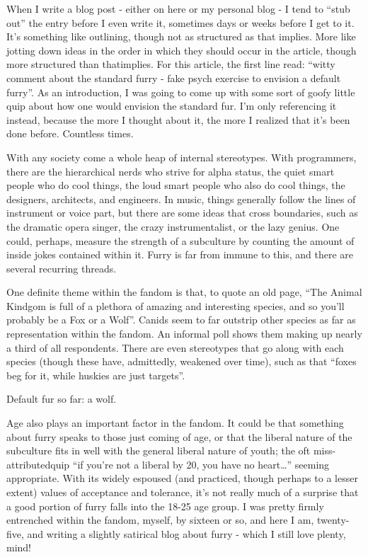 
When I write a blog post - either on here or my personal blog - I tend to ``stub out'' the entry before I even write it, sometimes days or weeks before I get to it. It's something like outlining, though not as structured as that implies. More like jotting down ideas in the order in which they should occur in the article, though more structured than thatimplies. For this article, the first line read: ``witty comment about the standard furry - fake psych exercise to envision a default furry''. As an introduction, I was going to come up with some sort of goofy little quip about how one would envision the standard fur. I'm only referencing it instead, because the more I thought about it, the more I realized that it's been done before. Countless times.

With any society come a whole heap of internal stereotypes. With programmers, there are the hierarchical nerds who strive for alpha status, the quiet smart people who do cool things, the loud smart people who also do cool things, the designers, architects, and engineers. In music, things generally follow the lines of instrument or voice part, but there are some ideas that cross boundaries, such as the dramatic opera singer, the crazy instrumentalist, or the lazy genius. One could, perhaps, measure the strength of a subculture by counting the amount of inside jokes contained within it. Furry is far from immune to this, and there are several recurring threads.

One definite theme within the fandom is that, to quote an old page, ``The Animal Kindgom is full of a plethora of amazing and interesting species, and so you'll probably be a Fox or a Wolf''. Canids seem to far outstrip other species as far as representation within the fandom. An informal poll shows them making up nearly a third of all respondents. There are even stereotypes that go along with each species (though these have, admittedly, weakened over time), such as that ``foxes beg for it, while huskies are just targets''.

Default fur so far: a wolf.

Age also plays an important factor in the fandom. It could be that something about furry speaks to those just coming of age, or that the liberal nature of the subculture fits in well with the general liberal nature of youth; the oft miss-attributedquip ``if you're not a liberal by 20, you have no heart\ldots{}'' seeming appropriate. With its widely espoused (and practiced, though perhaps to a lesser extent) values of acceptance and tolerance, it's not really much of a surprise that a good portion of furry falls into the 18-25 age group. I was pretty firmly entrenched within the fandom, myself, by sixteen or so, and here I am, twenty-five, and writing a slightly satirical blog about furry - which I still love plenty, mind!

